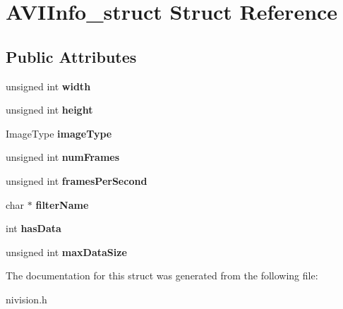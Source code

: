 \hypertarget{structAVIInfo__struct}{
\section{AVIInfo\_\-struct Struct Reference}
\label{structAVIInfo__struct}
}
\subsection*{Public Attributes}
\begin{DoxyCompactItemize}
\item 
\hypertarget{structAVIInfo__struct_a5930ecb40bba7452b33ee552e3230e31}{
unsigned int {\bfseries width}}
\label{structAVIInfo__struct_a5930ecb40bba7452b33ee552e3230e31}

\item 
\hypertarget{structAVIInfo__struct_a3a123b86f762fed55cc1793b09a302a5}{
unsigned int {\bfseries height}}
\label{structAVIInfo__struct_a3a123b86f762fed55cc1793b09a302a5}

\item 
\hypertarget{structAVIInfo__struct_a9caab71ecd15bf27bd517f3ebae69591}{
ImageType {\bfseries imageType}}
\label{structAVIInfo__struct_a9caab71ecd15bf27bd517f3ebae69591}

\item 
\hypertarget{structAVIInfo__struct_a204e45ff7d7833274a395aa580ba8c4f}{
unsigned int {\bfseries numFrames}}
\label{structAVIInfo__struct_a204e45ff7d7833274a395aa580ba8c4f}

\item 
\hypertarget{structAVIInfo__struct_a69c31dd80c11068e7b18ec1fb63d57c4}{
unsigned int {\bfseries framesPerSecond}}
\label{structAVIInfo__struct_a69c31dd80c11068e7b18ec1fb63d57c4}

\item 
\hypertarget{structAVIInfo__struct_a44fdba7cf78d56e46ab52c6ed3b937ca}{
char $\ast$ {\bfseries filterName}}
\label{structAVIInfo__struct_a44fdba7cf78d56e46ab52c6ed3b937ca}

\item 
\hypertarget{structAVIInfo__struct_a3ad06da8bb76683b47edeff6ac8b65f3}{
int {\bfseries hasData}}
\label{structAVIInfo__struct_a3ad06da8bb76683b47edeff6ac8b65f3}

\item 
\hypertarget{structAVIInfo__struct_a25df01a231bc516f0e75aed4fba04695}{
unsigned int {\bfseries maxDataSize}}
\label{structAVIInfo__struct_a25df01a231bc516f0e75aed4fba04695}

\end{DoxyCompactItemize}


The documentation for this struct was generated from the following file:\begin{DoxyCompactItemize}
\item 
nivision.h\end{DoxyCompactItemize}
